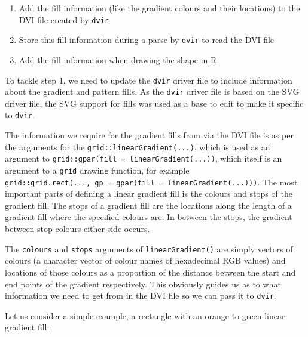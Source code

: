 \documentclass[]{article}
\begin{document}
\begin{enumerate}
\def\labelenumi{\arabic{enumi}.}
\item
  Add the fill information (like the gradient colours and their
  locations) to the DVI file created by \texttt{dvir}
\item
  Store this fill information during a parse by \texttt{dvir} to read
  the DVI file
\item
  Add the fill information when drawing the shape in R
\end{enumerate}

To tackle step 1, we need to update the \texttt{dvir} \Tikz{} driver
file to include information about the gradient and pattern fills. As the
\texttt{dvir} \Tikz{} driver file is based on the SVG \Tikz{} driver
file, the SVG support for \Tikz{} fills was used as a base to edit to
make it specific to \texttt{dvir}.

The information we require for the gradient fills from \Tikz{} via the
DVI file is as per the arguments for the
\texttt{grid::linearGradient(...)}, which is used as an argument to
\texttt{grid::gpar(fill\ =\ linearGradient(...))}, which itself is an
argument to a \texttt{grid} drawing function, for example
\texttt{grid::grid.rect(...,\ gp\ =\ gpar(fill\ =\ linearGradient(...)))}.
The most important parts of defining a linear gradient fill is the
colours and stops of the gradient fill. The stops of a gradient fill are
the locations along the length of a gradient fill where the specified
colours are. In between the stops, the gradient between stop colours
either side occurs.

The \texttt{colours} and \texttt{stops} arguments of
\texttt{linearGradient()} are simply vectors of colours (a character
vector of colour names of hexadecimal RGB values) and locations of those
colours as a proportion of the distance between the start and end points
of the gradient respectively. This obviously guides us as to what
information we need to get from \Tikz{} in the DVI file so we can pass
it to \texttt{dvir}.

Let us consider a simple example, a rectangle with an orange to green
linear gradient fill:

\begin{figure}
\centering
{}
\end{figure}
\end{document}
